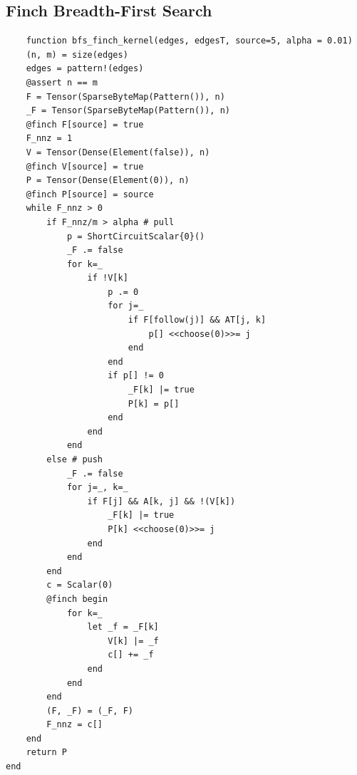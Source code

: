 \label{sec:graph_listings}

\subsection{Finch Breadth-First Search}
\begin{verbatim}
    function bfs_finch_kernel(edges, edgesT, source=5, alpha = 0.01)
    (n, m) = size(edges)
    edges = pattern!(edges)
    @assert n == m
    F = Tensor(SparseByteMap(Pattern()), n)
    _F = Tensor(SparseByteMap(Pattern()), n)
    @finch F[source] = true
    F_nnz = 1 
    V = Tensor(Dense(Element(false)), n)
    @finch V[source] = true
    P = Tensor(Dense(Element(0)), n)
    @finch P[source] = source
    while F_nnz > 0 
        if F_nnz/m > alpha # pull
            p = ShortCircuitScalar{0}()
            _F .= false
            for k=_ 
                if !V[k]
                    p .= 0
                    for j=_ 
                        if F[follow(j)] && AT[j, k]
                            p[] <<choose(0)>>= j
                        end 
                    end 
                    if p[] != 0
                        _F[k] |= true
                        P[k] = p[] 
                    end 
                end 
            end
        else # push
            _F .= false
            for j=_, k=_ 
                if F[j] && A[k, j] && !(V[k])
                    _F[k] |= true
                    P[k] <<choose(0)>>= j
                end 
            end 
        end 
        c = Scalar(0)
        @finch begin
            for k=_ 
                let _f = _F[k]
                    V[k] |= _f
                    c[] += _f
                end 
            end 
        end 
        (F, _F) = (_F, F)
        F_nnz = c[] 
    end 
    return P
end
\end{verbatim}
